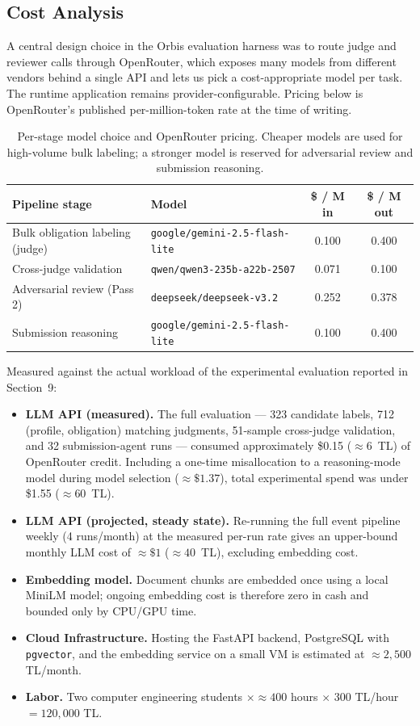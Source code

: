 \documentclass[a4paper,12pt]{article}
\begin{document}
\subsection{Cost Analysis}
A central design choice in the Orbis evaluation harness was to route judge and reviewer calls through OpenRouter, which exposes many models from different vendors behind a single API and lets us pick a cost-appropriate model per task. The runtime application remains provider-configurable. Pricing below is OpenRouter's published per-million-token rate at the time of writing.

\begin{table}[H]
\centering
\begin{tabular}{llcc}
\toprule
Pipeline stage & Model & \$ / M in & \$ / M out \\ \midrule
Bulk obligation labeling (judge) & \texttt{google/gemini-2.5-flash-lite} & 0.100 & 0.400 \\
Cross-judge validation & \texttt{qwen/qwen3-235b-a22b-2507} & 0.071 & 0.100 \\
Adversarial review (Pass 2) & \texttt{deepseek/deepseek-v3.2} & 0.252 & 0.378 \\
Submission reasoning & \texttt{google/gemini-2.5-flash-lite} & 0.100 & 0.400 \\
\bottomrule
\end{tabular}
\caption{Per-stage model choice and OpenRouter pricing. Cheaper models are used for high-volume bulk labeling; a stronger model is reserved for adversarial review and submission reasoning.}
\label{tab:cost_models}
\end{table}

Measured against the actual workload of the experimental evaluation reported in Section~9:
\begin{itemize}
    \item \textbf{LLM API (measured).} The full evaluation --- 323 candidate labels, 712 (profile, obligation) matching judgments, 51-sample cross-judge validation, and 32 submission-agent runs --- consumed approximately \$0.15 ($\approx 6$~TL) of OpenRouter credit. Including a one-time misallocation to a reasoning-mode model during model selection ($\approx \$1.37$), total experimental spend was under \$1.55 ($\approx 60$~TL).
    \item \textbf{LLM API (projected, steady state).} Re-running the full event pipeline weekly (4 runs/month) at the measured per-run rate gives an upper-bound monthly LLM cost of $\approx \$1$ ($\approx 40$~TL), excluding embedding cost.
    \item \textbf{Embedding model.} Document chunks are embedded once using a local MiniLM model; ongoing embedding cost is therefore zero in cash and bounded only by CPU/GPU time.
    \item \textbf{Cloud Infrastructure.} Hosting the FastAPI backend, PostgreSQL with \texttt{pgvector}, and the embedding service on a small VM is estimated at $\approx 2{,}500$ TL/month.
    \item \textbf{Labor.} Two computer engineering students $\times \approx 400$ hours $\times$ 300 TL/hour $= 120{,}000$ TL.
\end{itemize}
\end{document}
